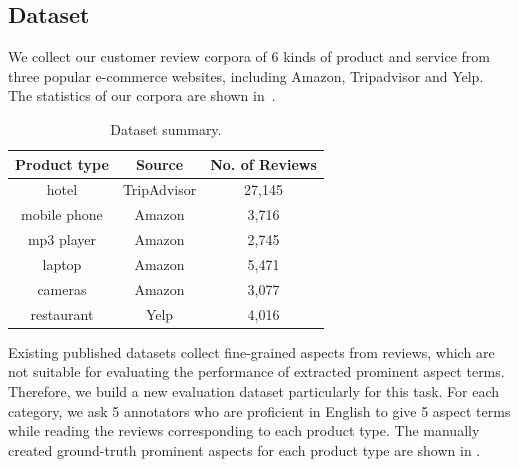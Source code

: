 \subsection{Dataset}
We collect our customer review corpora of 6 kinds of product and service
from three popular e-commerce websites, including Amazon, Tripadvisor and Yelp. 
The statistics of our corpora are shown in~.
\begin{table}[th]
\small
\centering
\caption{Dataset summary.} 
\label{table:dataset}
\begin{tabular}{|c|c|c|}
\hline
Product type & Source & No. of Reviews \\ \hline \hline
hotel        & TripAdvisor & 27,145   \\\hline
mobile phone & Amazon & 3,716  \\\hline
mp3 player   & Amazon & 2,745   \\\hline
laptop       & Amazon & 5,471   \\\hline
cameras & Amazon & 3,077  \\\hline
restaurant   & Yelp & 4,016   \\\hline
\end{tabular}
\end{table}

Existing published  datasets\cite{hu2004mining,popescu2007extracting,pavlopoulos2014aspect,ding2008holistic} 
collect fine-grained aspects from reviews,
which are not suitable for evaluating the performance of 
extracted prominent aspect terms. 
Therefore, we build a new evaluation dataset particularly for 
this task.
%
%
For each category, we ask 5 annotators who are proficient in English 
to give 5 aspect terms while reading the reviews corresponding to each product type. 
The manually created ground-truth prominent aspects for each product type are shown
in .


